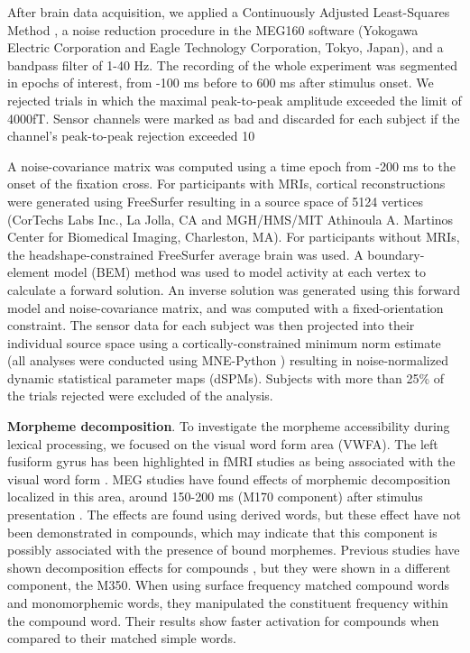 \documentclass{frontiersSCNS}
\begin{document}
After brain data acquisition, we applied a Continuously Adjusted Least-Squares Method \citep{Adachi:2001}, a noise reduction procedure in the MEG160 software (Yokogawa Electric Corporation and Eagle Technology Corporation, Tokyo, Japan), and a bandpass filter of 1-40 Hz.  The recording of the whole experiment was segmented in epochs of interest, from -100 ms before to 600 ms after stimulus onset.  We rejected trials in which the maximal peak-to-peak amplitude exceeded the limit of 4000fT. Sensor channels were marked as bad and discarded for each subject if the channel’s peak-to-peak rejection exceeded 10%

A noise-covariance matrix was computed using a time epoch from -200 ms to the onset of the fixation cross.  For participants with MRIs, cortical reconstructions were generated using FreeSurfer resulting in a source space of 5124 vertices (CorTechs Labs Inc., La Jolla, CA and MGH/HMS/MIT Athinoula A. Martinos Center for Biomedical Imaging, Charleston, MA). For participants without MRIs, the headshape-constrained FreeSurfer average brain was used. A boundary-element model (BEM) method was used to model activity at each vertex to calculate a forward solution. An inverse solution was generated using this forward model and noise-covariance matrix, and was computed with a fixed-orientation constraint. 
The sensor data for each subject was then projected into their individual source space using a cortically-constrained minimum norm estimate (all analyses were conducted using MNE-Python \citet*{Gramfort:2013, Gramfort:2013a}) resulting in noise-normalized dynamic statistical parameter maps (dSPMs). Subjects with more than 25\% of the trials rejected were excluded of the analysis. 

\textbf{Morpheme decomposition}. To investigate the morpheme accessibility during lexical processing, we focused on the visual word form area (VWFA). The left fusiform gyrus has been highlighted in fMRI studies as being associated with the visual word form \citep{Cohen:2004, Dehaene:2010}. MEG studies have found effects of morphemic decomposition localized in this area, around 150-200 ms (M170 component) after stimulus presentation \citep*{Zweig:2009, Lewis:2011, Solomyak:2010}.  The effects are found using derived words, but these effect have not been demonstrated in compounds, which may indicate that this component is possibly associated with the presence of bound morphemes.  Previous studies have shown decomposition effects for compounds \citep{Fiorentino:2007, Fiorentino:2009}, but they were shown in a different component, the M350.  When using surface frequency matched compound words and monomorphemic words, they manipulated the constituent frequency within the compound word. Their results show faster activation for compounds when compared to their matched simple words. 
 
\end{document}
